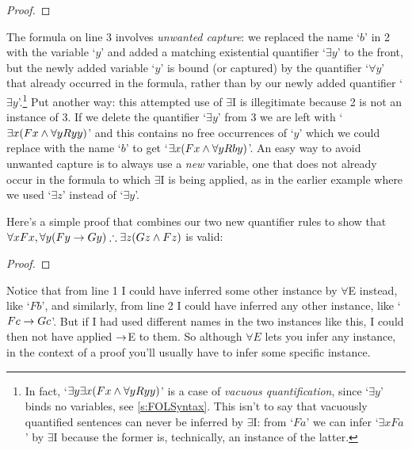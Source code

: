 \begin{proof}
	 
	 
\end{proof}
The formula on line 3 involves \emph{unwanted capture}: we replaced the name `$b$' in 2 with the variable `$y$' and added a matching existential quantifier `$\exists y$' to the front, but the newly added variable `$y$' is bound (or captured) by the quantifier `$\forall y$' that already occurred in the formula, rather than by our newly added quantifier `$\exists y$'.\footnote{In fact, `$\exists y\exists x(Fx \wedge \forall y Ryy)$' is a case of \emph{vacuous quantification}, since `$\exists y$' binds no variables, see \ref{s:FOLSyntax}.  This isn't to say that vacuously quantified sentences can never be inferred by $\exists$I: from `$Fa$' we can infer `$\exists xFa$' by $\exists$I because the former is, technically, an instance of the latter.} 
Put another way: this attempted use of $\exists$I is illegitimate because 2 is not an instance of 3.  If we delete the quantifier `$\exists y$' from 3 we are left with `$\exists x(Fx \wedge \forall y Ryy)$' and this contains no free occurrences of `$y$' which we could replace with the name `$b$' to get `$\exists x(Fx \wedge \forall y Rby)$'. An easy way to avoid unwanted capture is to always use a \emph{new} variable, one that does not already occur in the formula to which $\exists$I is being applied, as in the earlier example where we used `$\exists z$' instead of `$\exists y$'.


Here's a simple proof that combines our two new quantifier rules to show that $\forall xFx,  \forall y(Fy \rightarrow Gy) \therefore \exists z(Gz \land Fz)$ is valid:
\begin{proof}
	 
	 
\end{proof}
\noindent Notice that from line 1 I could have inferred some other instance by $\forall$E instead, like `$Fb$', and similarly, from line 2 I could have inferred any other instance, like `$Fc \rightarrow Gc$'. But if I had used different names in the two instances like this, I could then not have applied $\rightarrow$E to them.  So although $\forall E$ lets you infer any instance, in the context of a proof you'll usually have to infer some specific instance.

